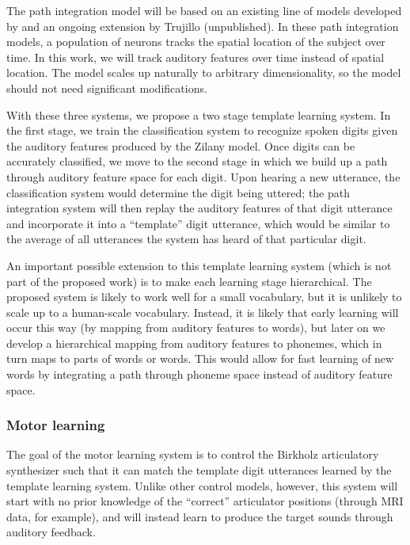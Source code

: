 \documentclass{article}
\begin{document}
The path integration model will be based
on an existing line of models
developed by \citet{conklin2005}
and an ongoing extension
by Trujillo (unpublished).
In these path integration models,
a population of neurons tracks
the spatial location of the subject
over time.
In this work, we will track
auditory features over time
instead of spatial location.
The \citeauthor{conklin2005}
model scales up naturally
to arbitrary dimensionality,
so the model should not need
significant modifications.

With these three systems,
we propose a
two stage template learning system.
In the first stage,
we train the classification system
to recognize spoken digits
given the auditory features
produced by the Zilany model.
Once digits can be accurately classified,
we move to the second stage
in which we build up a path through
auditory feature space for each digit.
Upon hearing a new utterance,
the classification system
would determine the digit being uttered;
the path integration system
will then replay the auditory features
of that digit utterance
and incorporate it into
a ``template'' digit utterance,
which would be similar to the
average of all utterances
the system has heard
of that particular digit.

An important possible extension to
this template learning system
(which is not part of the proposed work)
is to make each learning stage hierarchical.
The proposed system is likely
to work well for a small vocabulary,
but it is unlikely to scale up to
a human-scale vocabulary.
Instead, it is likely that
early learning will occur this way
(by mapping from auditory features to words),
but later on we develop a hierarchical mapping
from auditory features to phonemes,
which in turn maps to parts of words or words.
This would allow for fast learning
of new words by integrating
a path through phoneme space
instead of auditory feature space.

\subsubsection{Motor learning}
\label{subsec:motor-learning}

The goal of the motor learning system
is to control the Birkholz articulatory synthesizer
such that it can match
the template digit utterances learned
by the template learning system.
Unlike other control models, however,
this system will start with
no prior knowledge
of the ``correct'' articulator positions
(through MRI data, for example),
and will instead learn
to produce the target sounds
through auditory feedback.
\end{document}

